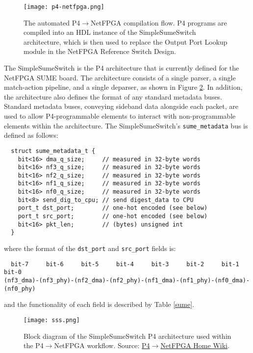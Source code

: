 \begin{figure}[ht]
	\centering
	\texttt{[image: p4-netfpga.png]}
	\caption{The automated P4$\rightarrow$NetFPGA compilation flow. P4 programs are compiled into an HDL instance of the SimpleSumeSwitch architecture, which is then used to replace the Output Port Lookup module in the NetFPGA Reference Switch Design.}
	\label{fig:p4-netfpga}
\end{figure}

The SimpleSumeSwitch is the P4 architecture that is currently defined for the NetFPGA SUME board. The architecture consists of a single parser, a single match-action pipeline, and a single deparser, as shown in Figure \ref{sss}. In addition, 
the architecture also defines the format of any standard metadata buses. Standard metadata buses, conveying sideband data alongside each packet, are used to allow P4-programmable elements to interact with non-programmable elements within the architecture. The SimpleSumeSwitch’s \verb|sume_metadata| bus is defined as follows:

{\renewcommand{\baselinestretch}{0.8}\small
	\begin{verbatim}
  struct sume_metadata_t {
    bit<16> dma_q_size;     // measured in 32-byte words
    bit<16> nf3_q_size;     // measured in 32-byte words
    bit<16> nf2_q_size;     // measured in 32-byte words
    bit<16> nf1_q_size;     // measured in 32-byte words
    bit<16> nf0_q_size;     // measured in 32-byte words
    bit<8> send_dig_to_cpu; // send digest_data to CPU
    port_t dst_port;        // one-hot encoded (see below)
    port_t src_port;        // one-hot encoded (see below)
    bit<16> pkt_len;        // (bytes) unsigned int
  }
	\end{verbatim}
}

where the format of the \verb|dst_port| and \verb|src_port| fields is:

{\renewcommand{\baselinestretch}{0.8}\small
	\begin{verbatim}
  bit-7     bit-6     bit-5     bit-4     bit-3     bit-2     bit-1     bit-0
(nf3_dma)-(nf3_phy)-(nf2_dma)-(nf2_phy)-(nf1_dma)-(nf1_phy)-(nf0_dma)-(nf0_phy)
	\end{verbatim}
}

and the functionality of each field is described by Table \ref{sume}. 

\begin{figure}[h]
	\centering
	\texttt{[image: sss.png]}
	\caption{Block diagram of the SimpleSumeSwitch P4 architecture used within the P4$\rightarrow$NetFPGA workflow. Source: \href{https://github.com/NetFPGA/P4-NetFPGA-public/wiki/Workflow-Overview\#simplesumeswitch-architecture}{P4$\rightarrow$NetFPGA Home Wiki}.} 
	\label{sss}
\end{figure}

